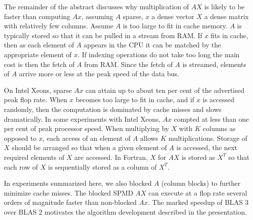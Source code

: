 \documentclass{report}
\begin{document}
The remainder of the abstract discusses why multiplication of $AX$ is
likely to be faster than computing $Ax$, assuming $A$ sparse, $x$ a dense
vector $X$ a dense matrix with relatively few columns. Assume $A$ is too
large to fit in cache memory. $A$ is typically stored so that it can be
pulled in a stream from RAM.
If $x$ fits in cache, then as each element of $A$ appears in the CPU it
can be matched by the appropriate element of $x$. If indexing operations
do not take too long the main cost is then the fetch of $A$ from RAM.
Since the fetch of $A$ is streamed, elements of $A$ arrive more or less
at the peak speed of the data bus.

On Intel Xeons, sparse $Ax$ can attain up to about ten per cent of the
advertised peak flop rate. When $x$ becomes too large to fit in cache,
and if $x$ is accessed randomly, then the
computation is dominated by cache misses and slows dramatically. In some
experiments with Intel Xeons, $Ax$ compted at less than one per cent of
peak processor speed. When multiplying by $X$ with $K$ columns as opposed
to $x$, each access of an element of $A$ allows $K$ multiplications.
Storage of $X$ should be arranged so that when a given element of $A$ is
accessed, the next required elements of $X$ are accessed. In Fortran, $X$
for $AX$ is stored as $X^T$ so that each row of $X$ is sequentially
stored as a column of $X^T$.

In experiments summarized here, we also blocked $A$ (column blocks) to
further minimize cache misses. The blocked SPMD $AX$ can execute at a
flop rate several orders of magnitude faster than non-blocked $Ax$. The
marked speedup of BLAS 3 over BLAS 2 motivates the algorithm development
described in the presentation.
\end{document}
